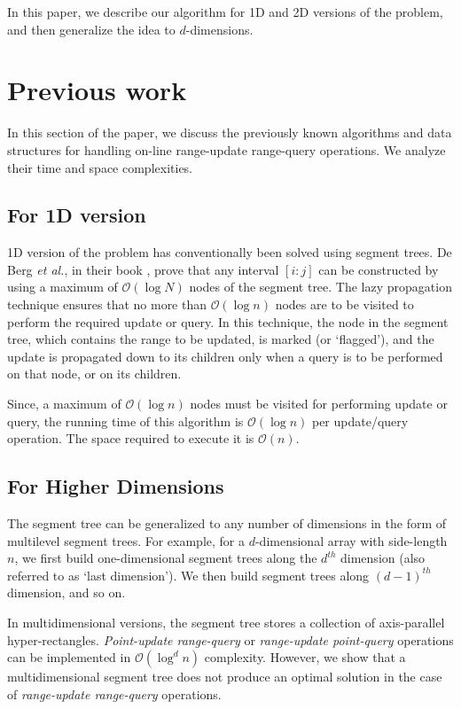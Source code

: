 \documentclass[a4paper]{article}
\begin{document}
\vspace{2 mm}
\noindent
In this paper, we describe our algorithm for 1D and 2D versions of the problem, and then generalize the idea to $d$-dimensions.



\section{Previous work}
In this section of the paper, we discuss the previously known algorithms and data structures for handling on-line range-update range-query operations. We analyze their time and space complexities.



\subsection{For 1D version}
1D version of the problem has conventionally been solved using segment trees. De Berg \textit{et al.}, in their book \cite[p. 226]{ST}, prove that any interval $[i : j]$ can be constructed by using a maximum of $\mathcal{O}(\log N)$ nodes of the segment tree. The lazy propagation technique ensures that no more than $\mathcal{O}(\log n)$ nodes are to be visited to perform the required update or query. In this technique, the node in the segment tree, which contains the range to be updated, is marked (or `flagged'), and the update is propagated down to its children only when a query is to be performed on that node, or on its children.

\vspace{2 mm}
Since, a maximum of $\mathcal{O}(\log n)$ nodes must be visited for performing update or query, the running time of this algorithm is $\mathcal{O}(\log n)$ per update/query operation. The space required to execute it is $\mathcal{O}(n)$.\cite[p. 226-227]{ST}



\subsection{For Higher Dimensions}
The segment tree can be generalized to any number of dimensions in the form of multilevel segment trees. For example, for a $d$-dimensional array with side-length $n$, we first build one-dimensional segment trees along the $d^{th}$ dimension (also referred to as `last dimension'). We then build segment trees along $(d-1)^{th}$ dimension, and so on. 

\vspace{2 mm}
In multidimensional versions, the segment tree stores a collection of axis-parallel hyper-rectangles. \textit{Point-update range-query} or \textit{range-update point-query} operations can be implemented in $\mathcal{O}(\log^d n)$ complexity. However, we show that a multidimensional segment tree does not produce an optimal solution in the case of \textit{range-update range-query} operations.
\end{document}
